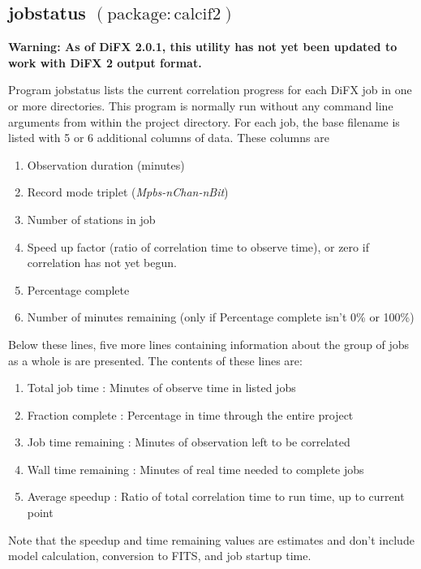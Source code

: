 
\subsection{jobstatus {\small $\mathrm{(package: calcif2)}$}} \label{sec:jobstatus}

\noindent
{\bf Warning: As of DiFX 2.0.1, this utility has not yet been updated to work with DiFX 2 output format.}

\noindent
Program jobstatus lists the current correlation progress for each DiFX job in one or more directories.
This program is normally run without any command line arguments from within the project directory.
For each job, the base filename is listed with 5 or 6 additional columns of data.
These columns are
\begin{enumerate}
\item Observation duration (minutes)
\item Record mode triplet ({\em Mpbs-nChan-nBit})
\item Number of stations in job
\item Speed up factor (ratio of correlation time to observe time), or zero if correlation has not yet begun.
\item Percentage complete
\item Number of minutes remaining (only if Percentage complete isn't 0\% or 100\%)
\end{enumerate}
Below these lines, five more lines containing information about the group of jobs as a whole is are presented.
The contents of these lines are:
\begin{enumerate}
\item Total job time : Minutes of observe time in listed jobs
\item Fraction complete : Percentage in time through the entire project
\item Job time remaining : Minutes of observation left to be correlated
\item Wall time remaining : Minutes of real time needed to complete jobs
\item Average speedup : Ratio of total correlation time to run time, up to current point
\end{enumerate}
Note that the speedup and time remaining values are estimates and don't include model calculation, conversion to FITS, and job startup time.

